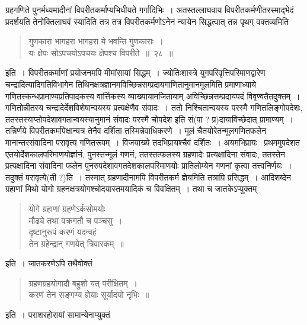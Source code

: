 \documentclass[11pt, openany]{book}
\begin{document}
ग्रहगणिते पुनर्मध्यमादीनां विपरीतकर्माप्यभिधीयते गर्गादिभिः~। अतस्तल्लाघवाय विपरीतकर्मणीतरस्माद्भेदं प्रदर्शयति तेनोक्तिलाघवं स्यादिति तत्र तत्र
विपरीतकर्मणोऽनेन न्यायेन सिद्धत्वात् तन्न पृथग् वक्तव्यमिति\textendash

\begin{quote}
{\qt गुणकारा भागहरा भागहरा ये भवन्ति गुणकाराः~।\\
यः क्षेपः सोऽपचयोऽपचयः क्षेपश्च विपरीते~॥~२८~॥}
\end{quote}

इति~। विपरीतकर्माणां प्रयोजनमपि मीमांसायां सिद्धम्~। ज्योतिःशास्त्रे युगपरिवृत्तिपरिमाणद्वारेण चन्द्रादित्यादिगतिविभागेन तिथिनक्षत्रज्ञानमविच्छिन्नसम्प्रदायगाणितानुमानमूलमिति प्रमाणाध्याये गणितस्कन्धप्रामाण्यप्रतिपादकस्य वार्त्तिकस्य व्याख्यायामजितायाम्
अविच्छिन्नसम्प्रदायपदं विवृण्वतैतदुक्तम्~। गणितोन्नीतस्य चन्द्रादेर्देशविशेषान्वयस्य प्रत्यक्षेणैव संवादः~। ततो निश्चितान्वयस्य परस्मै गणितलिङ्गोपदेशः,
ततस्तस्याप्तोपदेशावगतान्वयस्यानुमानं संवादः परस्मै चोपदेश इति सं(पा ? प्र)दायाविच्छेदात् प्रामाण्यम्~। तन्निर्णये विपरीतकर्मापेक्षान्यत्र तेनैव दर्शिता तस्मिन्नेवाधिकरणे~। मूलं चैतयोरेतन्मूलगणितफलेन मानान्तरसंवादिना परावृत्य गणितरूपम्~। विजयाख्ये तदभिप्रायश्चैवं दर्शितः~। अयमभिप्रायः \textendash\ प्रथममुपदेशत एतयोर्देशकालपरिमाणयोर्ज्ञानं, पुनस्तन्मूलं गणनं, ततस्तत्फलस्य ग्रहणादेः प्रत्यक्षादिना संवादः, ततस्तेन प्रत्यक्षादिना संवादिना फलेन पुनरुपदेशावगतदेशकालपरिमाणयोः प्रातिलोम्येन गणनां कृत्वा तत्त्वनिर्णयः~। तदुक्तं परावृत्ये(ती ?)ति~। तस्मात् ग्रहणादीनामपि विपरीतकर्म ज्ञेयमिति तत्रापि प्रसिद्धम्~। आदिशब्देन ग्रहाणां मिथो योगो ग्रहनक्षत्रयोगश्चोदयास्तमयादिकं च विवक्षितम्~। तथा च जातकेऽप्युक्तम्\textendash

\newpage


\begin{quote}
{\qt योगे ग्रहाणां ग्रहणेऽर्कसोमयोः\\
मौढ्ये तथा वक्रगतौ च पञ्चसु~।\\
दृष्टानुरूपं करणं यदन्वहं\\
तेन ग्रहेन्द्रान् गणयेत् त्रिवारकम्~॥}
\end{quote}

\noindent इति~। जातकरणेऽपि तथैवोक्तं\textendash 

\begin{quote}
{\qt ग्रहणग्रहयोगादौ बहुशो यत् परीक्षितम्~।\\
करणं तेन सङ्गण्य ज्ञेयाः सूर्यादयो नृभिः~॥}
\end{quote}

\noindent इति~। पराशरहोरायां सामान्येनाप्युक्तं\textendash
\end{document}
